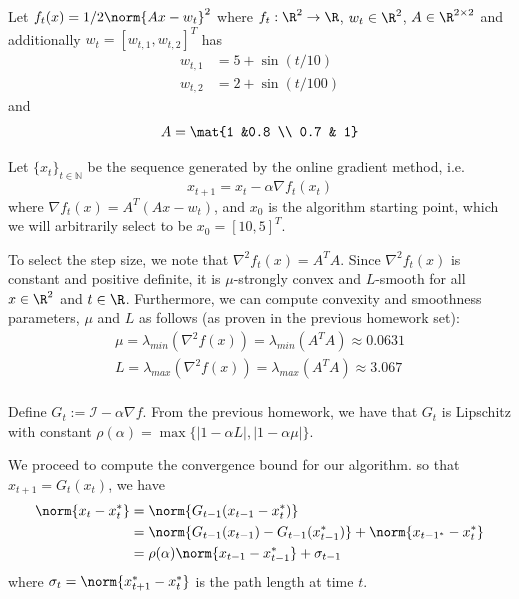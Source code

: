 \documentclass{homework}
\begin{document}
\begin{letterenum}
\item Let $f_t(x) = 1/2 \norm{Ax - w_t}^2$ where $f_t: \R^2 \to \R$,
$w_t \in \R^2$, $A\in \R^{2\times 2}$ and additionally
$w_t = [w_{t,1}, w_{t,2}]^T$ has
\begin{align*}
    w_{t,1} &= 5 + \sin(t/10) \\
    w_{t,2} &= 2 + \sin(t/100)
\end{align*}
and
\begin{equation*}
    A = \mat{1 &0.8 \\ 0.7 & 1}
\end{equation*}

Let $\{x_t\}_{t \in \mathbb{N}}$ be the sequence generated by the online gradient
method, i.e.
\begin{equation*}
    x_{t+1} = x_t - \alpha \nabla f_t(x_t)
\end{equation*}
where $\nabla f_t(x) = A^T (Ax - w_t)$, and $x_0$ is the algorithm starting
point, which we will arbitrarily select to be $x_0 = [10, 5]^T$.

To select the step size, we note that $\nabla^2f_t(x) = A^T A$. Since
$\nabla^2 f_t(x)$ is constant and positive definite,
it is $\mu$-strongly convex and $L$-smooth for all $x\in\R^2$ and $t\in\R$.
Furthermore, we can compute convexity and smoothness parameters, $\mu$ and $L$
as follows (as proven in the previous homework set):
\begin{align*}
    \mu = \lambda_{min} (\nabla^2 f(x)) = \lambda_{min} (A^T A) \approx 0.0631 \\
    L = \lambda_{max} (\nabla^2 f(x)) = \lambda_{max} (A^T A) \approx 3.067 \\
\end{align*}

Define $G_t := \mathcal{I} - \alpha \nabla f$. From the previous homework,
we have that $G_t$ is Lipschitz with constant
$\rho(\alpha) = \max \{ | 1- \alpha L|, |1 - \alpha \mu| \}$.

We proceed to compute the convergence bound for our algorithm. 
so that $x_{t+1} = G_t(x_t)$, we have
\begin{align*}
    \norm{x_t - x_t^*} &= \norm{G_{t-1}(x_{t-1} - x_t^*)} \\
        &= \norm{G_{t-1}(x_{t-1}) - G_{t-1}(x_{t-1}^*)} +
            \norm{x_{t-1^*} - x_t^*} \\
        &= \rho(\alpha) \norm{x_{t-1} - x_{t-1}^*} + \sigma_{t-1}
\end{align*}
where $\sigma_t = \norm{x_{t+1}^* - x_t^*}$ is the path length at time $t$.


\end{letterenum}
\end{document}

